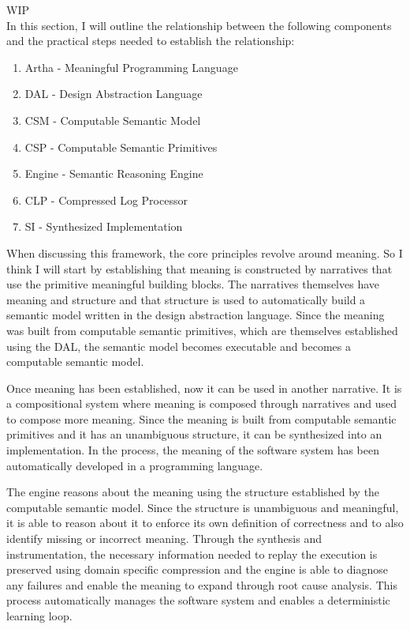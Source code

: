 {\color{red}WIP}\\

In this section, I will outline the relationship between the following components and the practical steps needed to establish the relationship:

\begin{enumerate}
    \item Artha - Meaningful Programming Language
    \item DAL - Design Abstraction Language
    \item CSM - Computable Semantic Model
    \item CSP - Computable Semantic Primitives
    \item Engine - Semantic Reasoning Engine
    \item CLP - Compressed Log Processor
    \item SI - Synthesized Implementation
\end{enumerate}

When discussing this framework, the core principles revolve around meaning. So I think I will start by establishing that meaning is constructed by narratives that use the primitive meaningful building blocks. The narratives themselves have meaning and structure and that structure is used to automatically build a semantic model written in the design abstraction language. Since the meaning was built from computable semantic primitives, which are themselves established using the DAL, the semantic model becomes executable and becomes a computable semantic model.

Once meaning has been established, now it can be used in another narrative. It is a compositional system where meaning is composed through narratives and used to compose more meaning. Since the meaning is built from computable semantic primitives and it has an unambiguous structure, it can be synthesized into an implementation. In the process, the meaning of the software system has been automatically developed in a programming language.

The engine reasons about the meaning using the structure established by the computable semantic model. Since the structure is unambiguous and meaningful, it is able to reason about it to enforce its own definition of correctness and to also identify missing or incorrect meaning. Through the synthesis and instrumentation, the necessary information needed to replay the execution is preserved using domain specific compression and the engine is able to diagnose any failures and enable the meaning to expand through root cause analysis. This process automatically manages the software system and enables a deterministic learning loop. 

